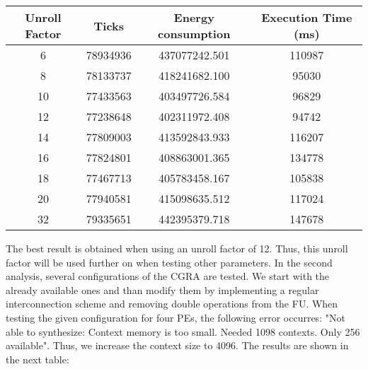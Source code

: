 		\begin{center}
			\begin{tabular}{||c | c c c ||} 
			\hline
			Unroll Factor & Ticks & Energy consumption & Execution Time (ms)\\ [0.5ex] 
			\hline\hline
			6 & 78934936 & 437077242.501 & 110987 \\
			\hline
			8 & 78133737 & 418241682.100 & 95030 \\
			\hline
			10 & 77433563 & 403497726.584 & 96829 \\
			\hline
			12 & 77238648 & 402311972.408 & 94742 \\
			\hline
			14 & 77809003 & 413592843.933 & 116207 \\  
			\hline
			16 & 77824801 & 408863001.365 & 134778 \\  
			\hline
			18 & 77467713 & 405783458.167 & 105838 \\ 
			\hline
			20 & 77940581 & 415098635.512 & 117024 \\  
			\hline
			32 & 79335651 & 442395379.718 & 147678 \\
			\hline
			\end{tabular}
		\end{center}
	  
		The best result is obtained when using an unroll factor of 12. Thus, this unroll factor will be used further on when testing other parameters. \newline
		In the second analysis, several configurations of the CGRA are tested. We start with the already available ones and than modify them by implementing a regular interconnection scheme and removing double operations from the FU. When testing the given configuration for four PEs, the following error occurres: "Not able to synthesize: Context memory is too small. Needed 1098 contexts. Only 256 available". Thus, we increase the context size to 4096. The results are shown in the next table:
  
